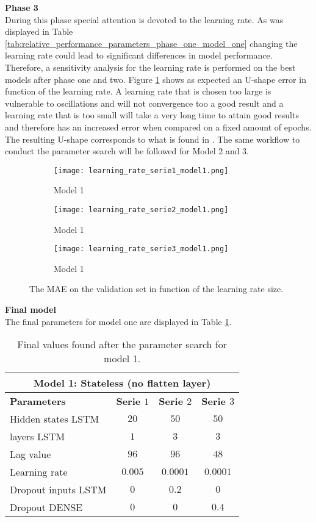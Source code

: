 \textbf{Phase 3}\\
During this phase special attention is devoted to the learning rate. As was displayed in Table \ref{tab:relative_performance_parameters_phase_one_model_one} changing the learning rate could lead to significant differences in model performance. Therefore, a sensitivity analysis for the learning rate is performed on the best models after phase one and two. Figure \ref{fig:learning_rate_model1} shows as expected an U-shape error in function of the learning rate. A learning rate that is chosen too large is vulnerable to oscillations and will not convergence too a good result and a learning rate that is too small will take a very long time to attain good results and therefore has an increased error when compared on a fixed amount of epochs. The resulting U-shape corresponds to what is found in \cite{Greff2017}. The same workflow to conduct the parameter search will be followed for Model 2 and 3.\\

\begin{figure}[h!]
	\centering
	\begin{subfigure}{0.49\linewidth}
		\texttt{[image: learning\_rate\_serie1\_model1.png]}
		\caption{Model 1}
	\end{subfigure}	
	\begin{subfigure}{0.49\linewidth}
		\texttt{[image: learning\_rate\_serie2\_model1.png]}
		\caption{Model 1}
	\end{subfigure}
	\begin{subfigure}{0.5\linewidth}
		\texttt{[image: learning\_rate\_serie3\_model1.png]}
		\caption{Model 1}
	\end{subfigure}
	\caption{The MAE on the validation set in function of the learning rate size.}
	\label{fig:learning_rate_model1}
\end{figure}


\textbf{Final model}\\
The final parameters for model one are displayed in Table \ref{tab:final_model1}.

\begin{table}[h!]
	\centering
	\begin{tabular}{@{}l|ccc@{}} \toprule
		\multicolumn{4}{c}{Model 1: Stateless (no flatten layer)}\\\midrule\midrule
		\textbf{Parameters}	& \textbf{Serie $ 1 $} & \textbf{Serie $ 2 $} & \textbf{Serie $ 3 $}\\\midrule
		Hidden states LSTM & $20 $&$ 50 $  & $50 $\\
		layers LSTM & $1 $&$ 3 $  & $3$\\
		Lag value & $96 $&$ 96$  & $48$\\
		Learning rate & $0.005 $&$ 0.0001$  & $0.0001$\\\hline
		Dropout inputs LSTM   & $ 0 $ & $ 0.2 $ & $ 0 $\\
		Dropout DENSE   & $ 0 $ & $ 0 $ & $ 0.4 $\\\bottomrule
	\end{tabular}
	\caption{Final values found after the parameter search for model 1.}
	\label{tab:final_model1}
\end{table}

